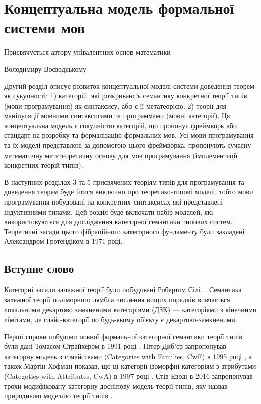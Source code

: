 
\chapter{Концептуальна модель формальної системи мов}
\epigraph{Присвячується автору унівалентних основ математики}{Володимиру Воєводському}

Другий розділ описує розвиток концептуальної моделі системи доведення теорем як сукупності:
1) категорій, які розкривають семантику конкретної теорії типів (мови програмування) як синтаксису, або є її метатеорією.
2) теорії для маніпуляції мовними синтаксисами та программами (мовні категорії).
Ця концептуальна модель є сокупністю категорій, що пропонує фреймворк або стандарт
на розробку та формалізацію формальних мов. Усі мови програмування та їх моделі представлені
за допомогою цього фреймворка, пропонують сучасну математичну метатеоретичну основу для
мов програмування (імплементації конкретних теорій типів).

В наступних розділах 3 та 5 присвячених теоріям типів для програмування та доведення теорем
буде йтися виключно про теоретико-типові моделі, тобто мови програмування побудовані
на конкретних синтаксисах які представлені індуктивними типами. Цей розділ буде включати
набір моделей, які використовуються для дослідження категорної семантики типових систем.
Теоретичні засади цього фібраційного категорного фундаменту були закладені Александром
Гротендіком в 1971 році.

\section*{Вступне слово}
Категорні засади залежної теорії були побудовані Робертом Сілі. \cite{Seely84}.
Семантика залежної теорії поліморного лямбла числення вищих порядків
вивчається локальними декартово замкненими категоріями (ДЗК) --- категоріями з кінечними лімітами,
де слайс-категорії по будь-якому об'єкту є декартово-замкненими.

Перші спрови побудови повної формальної категорної семантики теорії типів були дані
Томасом Страйхером в 1991 році \cite{Streicher91}. Пітер Диб'єр запропонував категорну модель з
сімействами (Categories with Families, CwF) в 1995 році \cite{Dybjer95}, а також Мартін Хофман показав, що ці
категорії ізоморфні категоріям з атрибутами (Categoties with Attributes, CwA) в 1997 році \cite{Hofmann97}.
Стів Еводі в 2016 запропонував трохи модифіковану категорну досніпову модель теорії типів,
яку назвав природньою моделлю теорії типів \cite{Awodey17NaturalModels}.

